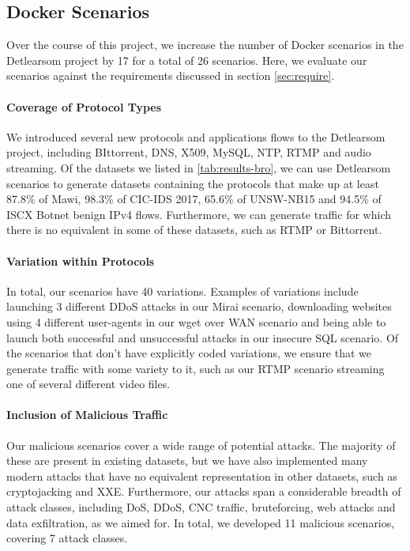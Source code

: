 \documentclass[msc,deptreport, cs]{infthesis} %
\begin{document}
\subsection{Docker Scenarios}
\label{sec:docker_results}
Over the course of this project, we increase the number of Docker scenarios in the Detlearsom project by 17 for a total of 26 scenarios. Here, we evaluate our scenarios against the requirements discussed in section \ref{sec:require}.

\paragraph*{Coverage of Protocol Types}

We introduced several new protocols and applications flows to the Detlearsom project, including BIttorrent, DNS, X509, MySQL, NTP, RTMP and audio streaming. Of the datasets we listed in \ref{tab:results-bro}, we can use Detlearsom scenarios to generate datasets containing the protocols that make up at least 87.8\% of Mawi, 98.3\% of CIC-IDS 2017, 65.6\% of UNSW-NB15 and 94.5\% of ISCX Botnet benign IPv4 flows. Furthermore, we can generate traffic for which there is no equivalent in some of these datasets, such as RTMP or Bittorrent.

\paragraph*{Variation within Protocols}

In total, our scenarios have 40 variations. Examples of variations include launching 3 different DDoS attacks in our Mirai scenario, downloading websites using 4 different user-agents in our wget over WAN scenario and being able to launch both successful and unsuccessful attacks in our insecure SQL scenario. Of the scenarios that don't have explicitly coded variations, we ensure that we generate traffic with some variety to it, such as our RTMP scenario streaming one of several different video files.

\paragraph*{Inclusion of Malicious Traffic}

Our malicious scenarios cover a wide range of potential attacks. The majority of these are present in existing datasets, but we have also implemented many modern attacks that have no equivalent representation in other datasets, such as cryptojacking and XXE. Furthermore, our attacks span a considerable breadth of attack classes, including DoS, DDoS, CNC traffic, bruteforcing, web attacks and data exfiltration, as we aimed for. In total, we developed 11 malicious scenarios, covering 7 attack classes.
\end{document}
